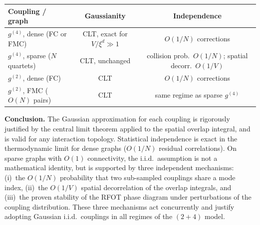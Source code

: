\documentclass[11pt,a4paper]{article}
\begin{document}
\begin{center}
\renewcommand{\arraystretch}{1.25}
\begin{tabular}{@{}lcc@{}}
\toprule
\textbf{Coupling / graph} & \textbf{Gaussianity} & \textbf{Independence} \\
\midrule
$g^{(4)}$, dense (FC or FMC) & CLT, exact for $V/\xi^d\gg1$
  & $O(1/N)$ corrections \\
$g^{(4)}$, sparse ($N$ quartets) & CLT, unchanged
  & collision prob.\ $O(1/N)$; spatial decorr.\ $O(1/V)$ \\
$g^{(2)}$, dense (FC) & CLT
  & $O(1/N)$ corrections \\
$g^{(2)}$, FMC ($O(N)$ pairs) & CLT
  & same regime as sparse $g^{(4)}$ \\
\bottomrule
\end{tabular}
\end{center}

\medskip\noindent
\textbf{Conclusion.}
The Gaussian approximation for each coupling is rigorously justified
by the central limit theorem applied to the spatial overlap integral,
and is valid for any interaction topology.
Statistical independence is exact in the thermodynamic limit for
dense graphs ($O(1/N)$ residual correlations).
On sparse graphs with $O(1)$ connectivity, the i.i.d.\ assumption
is not a mathematical identity, but is supported by three
independent mechanisms: (i)~the $O(1/N)$ probability that two
sub-sampled couplings share a mode index, (ii)~the $O(1/V)$ spatial
decorrelation of the overlap integrals, and (iii)~the proven
stability of the RFOT phase diagram under perturbations of the
coupling distribution.
These three mechanisms act concurrently and justify adopting
Gaussian i.i.d.\ couplings in all regimes of the $(2{+}4)$ model.
\end{document}
